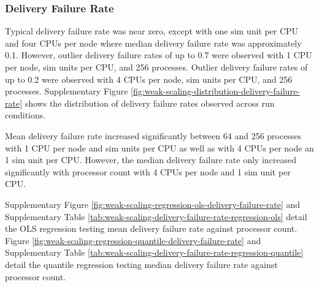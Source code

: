\subsubsection{Delivery Failure Rate}

Typical delivery failure rate was near zero, except with one sim unit per CPU and four CPUs per node where median delivery failure rate was approximately 0.1.
However, outlier delivery failure rates of up to 0.7 were observed with 1 CPU per node,  sim units per CPU, and 256 processes.
Outlier delivery failure rates of up to 0.2 were observed with 4 CPUs per node,  sim units per CPU, and 256 processes.
Supplementary Figure \ref{fig:weak-scaling-distribution-delivery-failure-rate} shows the distribution of delivery failure rates observed across run conditions.

Mean delivery failure rate increased significantly between 64 and 256 processes with 1 CPU per node and  sim units per CPU as well as with 4 CPUs per node an 1 sim unit per CPU.
However, the median delivery failure rate only increased significantly with processor count with 4 CPUs per node and 1 sim unit per CPU.



Supplementary Figure \ref{fig:weak-scaling-regression-ols-delivery-failure-rate} and Supplementary Table \ref{tab:weak-scaling-delivery-failure-rate-regression-ols} detail the OLS regression testing mean delivery failure rate against processor count.
Figure \ref{fig:weak-scaling-regression-quantile-delivery-failure-rate} and Supplementary Table \ref{tab:weak-scaling-delivery-failure-rate-regression-quantile} detail the quantile regression testing median delivery failure rate against processor count.

